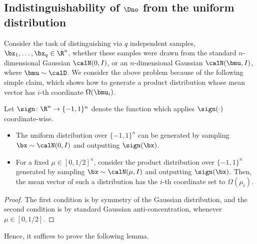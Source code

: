 \def\br{\mathbf{r}}

\subsection{Indistinguishability of $\Dno$ from the uniform distribution}

Consider the task of distinguishing via $q$ independent samples, $\bx_1, \dots, \bx_q \in \R^n$, whether these samples were drawn from the standard $n$-dimensional Gaussian $\calN(0, I)$, or an $n$-dimensional Gaussian $\calN(\bmu, I)$, where $\bmu \sim \calD$. We consider the above problem because of the following simple claim, which shows how to generate a product distribution whose mean vector has $i$-th coordinate $\Omega(\bmu_i)$.

\begin{claim}
Let $\sign\colon \R^n \to \{-1,1\}^n$ denote the function which applies $\sign(\cdot)$  coordinate-wise. 
\begin{flushleft}\begin{itemize}
\item The uniform distribution over $\{-1,1\}^n$ can be generated by sampling $\bx \sim \calN(0, I)$ and outputting $\sign(\bx)$.
\item For a fixed $\mu \in [0, 1/2]^n$, consider the product distribution over $\{-1,1\}^n$ generated by sampling $\bx \sim \calN( \mu, I)$ and outputting $\sign(\bx)$. Then, the mean vector of such a distribution has the $i$-th coordinate set to $\Omega(\mu_i)$.
\end{itemize}\end{flushleft}
\end{claim}

\begin{proof}
The first condition is by symmetry of the Gaussian distribution, and the second condition is by standard Gaussian anti-concentration, whenever $\mu \in [0, 1/2]$.
\end{proof}

Hence, it suffices to prove the following lemma.

